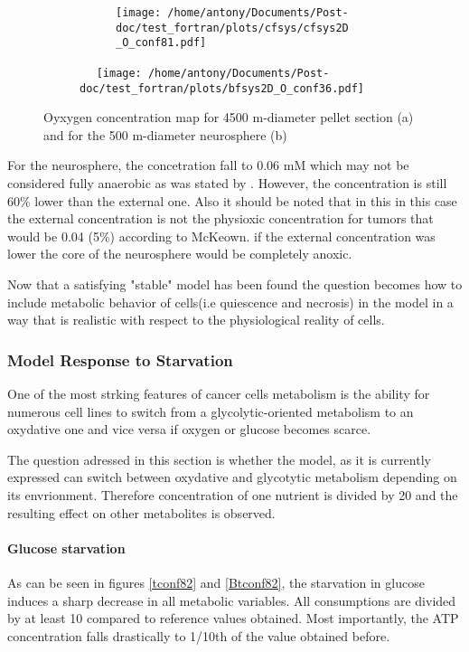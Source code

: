 \documentclass[11pt,a4paper]{article}
\begin{document}
\begin{figure}[ht!]
	\begin{subfigure}{0.45\textwidth}
	\centering
		\begin{subfigure}{0.45\textwidth}
	\texttt{[image: /home/antony/Documents/Post-doc/test\_fortran/plots/cfsys/cfsys2D\_O\_conf81.pdf]}
		\caption{ \label{O_conf81}}
	\end{subfigure}
	~~
	\texttt{[image: /home/antony/Documents/Post-doc/test\_fortran/plots/bfsys2D\_O\_conf36.pdf]}
	\caption{ \label{O_conf36}}
	\end{subfigure}
	\caption{Oyxygen concentration map for 4500 \textmu m-diameter pellet section  (a) and for the 500 \textmu m-diameter neurosphere (b) \label{conf81}  }
\end{figure}
For the neurosphere, the concetration fall to 0.06 mM which may not be considered fully anaerobic as was stated by \cite{Kirsch1978}. However, the concentration is still 60\% lower than the external one. Also it should be noted that in this in this case the external concentration is not the physioxic concentration for tumors that would be 0.04 (5\%) according to McKeown. \cite{McKeown2014} if the external concentration was lower the core of the neurosphere would be completely anoxic.

Now that  a satisfying "stable" model has been found the question becomes how to include metabolic behavior of cells(i.e quiescence and necrosis) in the model in a way that is realistic with respect to the physiological reality of cells.

\subsubsection{Model Response to Starvation}
One of the most strking features of cancer cells metabolism is the ability for numerous cell lines to switch from a glycolytic-oriented metabolism to an oxydative one and vice versa if oxygen or glucose becomes scarce. \cite{MullerKlieser1986} \cite{Freyer1986}

The question adressed in this section is whether the model, as it is currently expressed can switch between oxydative and glycotytic metabolism depending on its envrionment. Therefore concentration of one nutrient is divided by 20 and the resulting effect on other metabolites is observed.

\paragraph{Glucose starvation}
As can be seen in figures \ref{tconf82} and \ref{Btconf82}, the starvation in glucose induces a sharp decrease in all metabolic variables. All consumptions are divided by at least 10 compared to reference values obtained. Most importantly, the ATP concentration falls drastically to 1/10th of the value obtained before.
\end{document}
